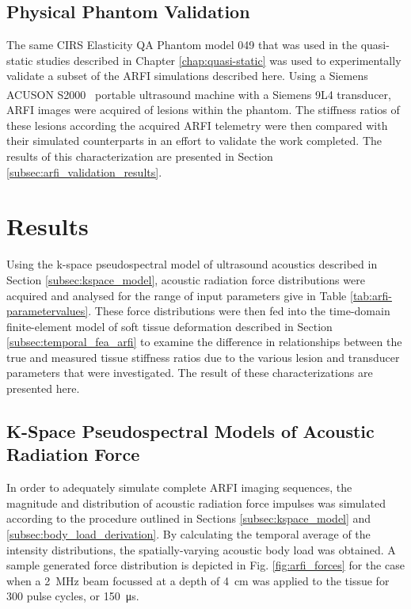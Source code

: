 		\FloatBarrier
		\subsection{Physical Phantom Validation}
		\label{subsec:arfi_physical_phantom}
			The same CIRS Elasticity QA Phantom model 049 that was used in the quasi-static studies described in Chapter \ref{chap:quasi-static} was used to experimentally validate a subset of the ARFI simulations described here. Using a Siemens ACUSON S2000\textsuperscript{\texttrademark}\  portable ultrasound machine with a Siemens 9L4  transducer, ARFI images were acquired of lesions within the phantom. The stiffness ratios of these lesions according the acquired ARFI telemetry were then compared with their simulated counterparts in an effort to validate the work completed. The results of this characterization are presented in Section \ref{subsec:arfi_validation_results}. 

	\section{Results}
	\label{sec:arfi_results}
		Using the k-space pseudospectral model of ultrasound acoustics described in Section \ref{subsec:kspace_model}, acoustic radiation force distributions were acquired and analysed for the range of input parameters give in Table \ref{tab:arfi-parametervalues}. These force distributions were then fed into the time-domain finite-element model of soft tissue deformation described in Section \ref{subsec:temporal_fea_arfi} to examine the difference in relationships between the true and measured tissue stiffness ratios due to the various lesion and transducer parameters that were investigated. The result of these characterizations are presented here.

		\subsection{K-Space Pseudospectral Models of Acoustic Radiation Force}
		\label{subsec:kspace_results}
			In order to adequately simulate complete ARFI imaging sequences, the magnitude and distribution of acoustic radiation force impulses was simulated according to the procedure outlined in Sections \ref{subsec:kspace_model} and \ref{subsec:body_load_derivation}. By calculating the temporal average of the intensity distributions, the spatially-varying acoustic body load was obtained. A sample generated force distribution is depicted in Fig. \ref{fig:arfi_forces} for the case when a \SI{2}{\MHz} beam focussed at a depth of \SI{4}{\cm} was applied to the tissue for 300 pulse cycles, or \SI{150}{\us}.


